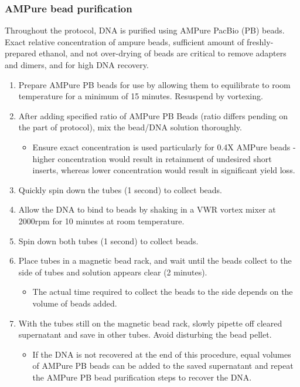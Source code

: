 \subsubsection{AMPure bead purification}
\label{proto: ampure}
Throughout the protocol, DNA is purified using AMPure PacBio (PB) beads. Exact relative concentration of ampure beads, sufficient amount of freshly-prepared ethanol, and not over-drying of beads are critical to remove adapters and dimers, and for high DNA recovery.   
\label{general_ampure_bead_purification}
\begin{enumerate}
	\item Prepare AMPure PB beads for use by allowing them to equilibrate to room temperature for a minimum of 15 minutes. Resuspend by vortexing.
	\item After adding specified ratio of AMPure PB Beads (ratio differs pending on the part of protocol), mix the bead/DNA solution thoroughly.
	\begin{itemize}
		\item Ensure exact concentration is used particularly for 0.4X AMPure beads - higher concentration would result in retainment of undesired short inserts, whereas lower concentration would result in significant yield loss. 
	\end{itemize} 
	\item Quickly spin down the tubes (1 second) to collect beads. 
	\item Allow the DNA to bind to beads by shaking in a VWR vortex mixer at 2000rpm for 10 minutes at room temperature. 
	\item Spin down both tubes (1 second) to collect beads. 
	\item Place tubes in a magnetic bead rack, and wait until the beads collect to the side of tubes and solution appears clear (2 minutes).
	\begin{itemize}
		\item The actual time required to collect the beads to the side depends on the volume of beads added.
	\end{itemize} 
	\item With the tubes still on the magnetic bead rack, slowly pipette off cleared supernatant and save in other tubes. Avoid disturbing the bead pellet.
		\begin{itemize}
		\item If the DNA is not recovered at the end of this procedure, equal volumes of AMPure PB beads can be added to the saved supernatant and repeat the AMPure PB bead purification steps to recover the DNA.

\end{itemize}
\end{enumerate}
